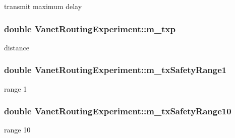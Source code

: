 transmit maximum delay 

\subsubsection[{\texorpdfstring{m\+\_\+txp}{m_txp}}]{\setlength{\rightskip}{0pt plus 5cm}double Vanet\+Routing\+Experiment\+::m\+\_\+txp\hspace{0.3cm}{\ttfamily [private]}}\hypertarget{classVanetRoutingExperiment_a8acdb7cf31487aa0d721263fde2a7f3e}{}\label{classVanetRoutingExperiment_a8acdb7cf31487aa0d721263fde2a7f3e}


distance 

\subsubsection[{\texorpdfstring{m\+\_\+tx\+Safety\+Range1}{m_txSafetyRange1}}]{\setlength{\rightskip}{0pt plus 5cm}double Vanet\+Routing\+Experiment\+::m\+\_\+tx\+Safety\+Range1\hspace{0.3cm}{\ttfamily [private]}}\hypertarget{classVanetRoutingExperiment_a32c5e4c13fb04e76a1165d281d46523c}{}\label{classVanetRoutingExperiment_a32c5e4c13fb04e76a1165d281d46523c}


range 1 

\subsubsection[{\texorpdfstring{m\+\_\+tx\+Safety\+Range10}{m_txSafetyRange10}}]{\setlength{\rightskip}{0pt plus 5cm}double Vanet\+Routing\+Experiment\+::m\+\_\+tx\+Safety\+Range10\hspace{0.3cm}{\ttfamily [private]}}\hypertarget{classVanetRoutingExperiment_a70efcbeee57dd1b12364ff3ef00f7b02}{}\label{classVanetRoutingExperiment_a70efcbeee57dd1b12364ff3ef00f7b02}


range 10 

